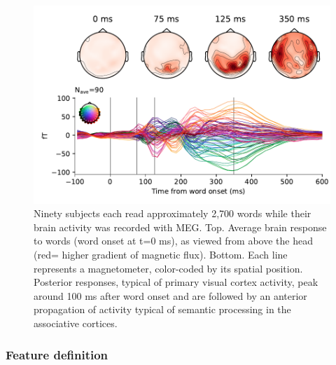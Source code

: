 \begin{figure}[t!]
  \begin{minipage}[c]{0.6\textwidth}
    \includegraphics[width=\textwidth, trim=0cm 0cm 0cm 0cm, clip=True]{figures/meg_evoked.pdf}
  \end{minipage}\hfill
  \begin{minipage}[c]{0.4\textwidth}
    \caption{Ninety subjects each read approximately 2,700 words while their brain activity was recorded with MEG. Top. Average brain response to words (word onset at t=0 ms), as viewed from above the head (red= higher gradient of magnetic flux). Bottom. Each line represents a magnetometer, color-coded by its spatial position. Posterior responses, typical of primary visual cortex activity, peak around 100 ms after word onset and are followed by an anterior propagation of activity typical of semantic processing in the associative cortices.
    }
    \label{fig:meg_evoked}
  \end{minipage}
\end{figure}


\subsubsection{Feature definition}

